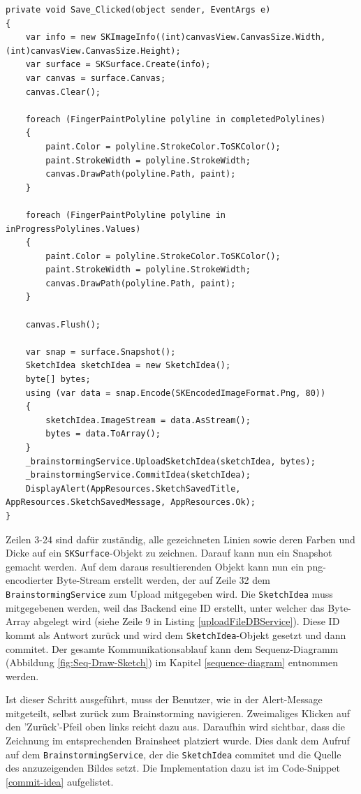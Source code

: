 \begin{lstlisting}[label={save-clicked-sketch},caption={Save Click-Eventhandler}]
private void Save_Clicked(object sender, EventArgs e)
{
	var info = new SKImageInfo((int)canvasView.CanvasSize.Width, (int)canvasView.CanvasSize.Height);
	var surface = SKSurface.Create(info);
	var canvas = surface.Canvas;
	canvas.Clear();
	
	foreach (FingerPaintPolyline polyline in completedPolylines)
	{
		paint.Color = polyline.StrokeColor.ToSKColor();
		paint.StrokeWidth = polyline.StrokeWidth;
		canvas.DrawPath(polyline.Path, paint);
	}
	
	foreach (FingerPaintPolyline polyline in inProgressPolylines.Values)
	{
		paint.Color = polyline.StrokeColor.ToSKColor();
		paint.StrokeWidth = polyline.StrokeWidth;
		canvas.DrawPath(polyline.Path, paint);
	}
	
	canvas.Flush();
	
	var snap = surface.Snapshot();
	SketchIdea sketchIdea = new SketchIdea();
	byte[] bytes;
	using (var data = snap.Encode(SKEncodedImageFormat.Png, 80))
	{
		sketchIdea.ImageStream = data.AsStream();
		bytes = data.ToArray();
	}
	_brainstormingService.UploadSketchIdea(sketchIdea, bytes);
	_brainstormingService.CommitIdea(sketchIdea);
	DisplayAlert(AppResources.SketchSavedTitle, AppResources.SketchSavedMessage, AppResources.Ok);
}
\end{lstlisting}
Zeilen 3-24 sind dafür zuständig, alle gezeichneten Linien sowie deren Farben und Dicke auf ein \texttt{SKSurface}-Objekt zu zeichnen. Darauf kann nun ein Snapshot gemacht werden. Auf dem daraus resultierenden Objekt kann nun ein png-encodierter Byte-Stream erstellt werden, der auf Zeile 32 dem \texttt{BrainstormingService} zum Upload mitgegeben wird. Die \texttt{SketchIdea} muss mitgegebenen werden, weil das Backend eine ID erstellt, unter welcher das Byte-Array abgelegt wird (siehe Zeile 9 in Listing \ref{uploadFileDBService}). Diese ID kommt als Antwort zurück und wird dem \texttt{SketchIdea}-Objekt gesetzt und dann commitet. Der gesamte Kommunikationsablauf kann dem Sequenz-Diagramm (Abbildung \ref{fig:Seq-Draw-Sketch}) im Kapitel \ref{sequence-diagram} entnommen werden. 

Ist dieser Schritt ausgeführt, muss der Benutzer, wie in der Alert-Message mitgeteilt, selbst zurück zum Brainstorming navigieren. Zweimaliges Klicken auf den 'Zurück'-Pfeil oben links reicht dazu aus. Daraufhin wird sichtbar, dass die Zeichnung im entsprechenden Brainsheet platziert wurde. Dies dank dem Aufruf auf dem \texttt{BrainstormingService}, der die \texttt{SketchIdea} commitet und die Quelle des anzuzeigenden Bildes setzt. Die Implementation dazu ist im Code-Snippet \ref{commit-idea} aufgelistet.

